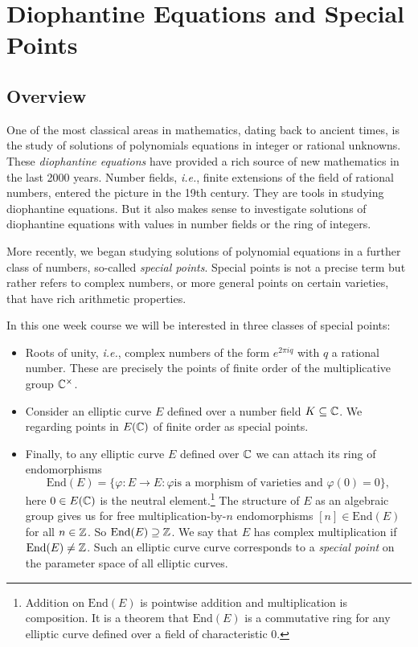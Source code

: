 \chapter{Diophantine Equations and Special Points}

\section{Overview}

One of the most classical areas in mathematics, dating back to ancient
times, is the study of solutions of polynomials equations in integer
or rational unknowns. These \textit{diophantine equations} have
provided a rich source of new mathematics in the last 2000 years.
Number fields, \textit{i.e.}, finite extensions of the field of
rational numbers, entered the picture in the 19th century. They are
tools in studying diophantine equations. But it also makes sense to
investigate solutions of diophantine equations with values in number
fields or the ring of integers.

More recently, we began studying solutions of polynomial equations in
a further class of numbers, so-called \textit{special points}. Special
points is not a precise term but rather refers to complex numbers, or
more general points on certain varieties, that have rich arithmetic
properties.

In this one week course we will be interested in three classes of
special points:
\begin{itemize}
\item Roots of unity, \textit{i.e.}, complex numbers of the form
  $e^{2\pi i q}$ with $q$ a rational number. These are precisely the
  points of finite order of the multiplicative group ${\mathbb{C}}^\times$. 

\item Consider an elliptic curve $E$ defined over a number field
  $K\subseteq{\mathbb{C}}$. We regarding points in $E({\mathbb{C}})$ of finite order as
  special points.

\item Finally, to any elliptic curve $E$ defined over ${\mathbb{C}}$ we can
  attach its ring of endomorphisms
  $$\mathrm{End}(E) = \{\varphi \colon E\rightarrow E : \varphi\text{
    is a morphism of varieties and }\varphi(0)=0\},$$
  here $0\in E({\mathbb{C}})$ is the neutral element.\footnote{Addition on
    $\mathrm{End}(E)$ is pointwise addition and multiplication is
    composition. It is a theorem that $\mathrm{End}(E)$ is a
    commutative ring for any elliptic curve defined over a field of
    characteristic $0$.}
  The  structure of $E$ as an algebraic group gives us for free
  multiplication-by-$n$ endomorphisms $[n] \in \mathrm{End}(E)$ for
  all $n\in{\mathbb{Z}}$. So $\mathrm{End}(E) \supseteq {\mathbb{Z}}$.
  We say that $E$ has complex multiplication if
  $\mathrm{End}(E)\not={\mathbb{Z}}$.
  Such an elliptic curve curve corresponds to a \textit{special point}
  on the parameter space of all elliptic curves.   
\end{itemize}

